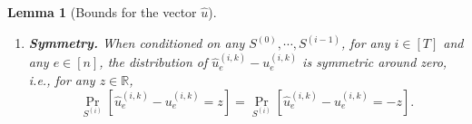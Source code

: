 \documentclass[11pt]{article}
\newtheorem{lemma}[theorem]{Lemma}
\let\originalleft\left
\let\originalright\right
\renewcommand{\left}{\mathopen{}\mathclose\bgroup\originalleft}
\renewcommand{\right}{\aftergroup\egroup\originalright}
\newcommand\uu{\boldsymbol{\mathit{u}}}
\newcommand\ww{\boldsymbol{\mathit{w}}}
\newcommand\rrbar{\overline{\boldsymbol{\mathit{r}}}}
\renewcommand\SS{\boldsymbol{\mathit{S}}}
\newcommand{\wh}{\widehat}
\newcommand\R{\mathbb{R}}
\begin{document}
\begin{lemma}[Bounds for the vector $\wh{\uu}$]
\begin{enumerate}
\begin{itemize}
\begin{align*}
\Pr_{\SS^{(i)}}\left[| \sum_e \ww_e^{(i,k)} \cdot (\wh{\uu}^{(i,k)}_e - \uu^{(i,k)}_e)| \leq \frac{C_2}{\sqrt{b}} \cdot \Phi(\ww^{(i,k)})^{1/2} \cdot \Psi(\rrbar^{(i,k)})^{1/2} \right] \geq &~ 1 - 1/n^4, \\
\Pr_{\SS^{(i)}}\left[| \sum_e \rrbar_e^{(i,k)} \cdot (\wh{\uu}^{(i,k)}_e - \uu^{(i,k)}_e)| \leq \frac{C_2 (1 + \epsilon)}{\sqrt{b}} \cdot \Phi(\ww^{(i,k)})^{1/2} \cdot \Psi(\rrbar^{(i,k)})^{1/2} \right] \geq &~ 1 - 1/n^4.
\end{align*}
\end{itemize}
\item {\bf Symmetry.} When conditioned on any $\SS^{(0)}, \cdots, \SS^{(i-1)}$, for any $i \in [T]$ and any $e \in [n]$, the distribution of $\wh{\uu}^{(i,k)}_e - \uu^{(i,k)}_e$ is symmetric around zero, i.e., for any $z \in \R$, 
\[
\Pr_{\SS^{(i)}}[\wh{\uu}^{(i,k)}_e - \uu^{(i,k)}_e = z] = \Pr_{\SS^{(i)}}[\wh{\uu}^{(i,k)}_e - \uu^{(i,k)}_e = -z].
\]
\end{enumerate}
\end{lemma}
\end{document}
